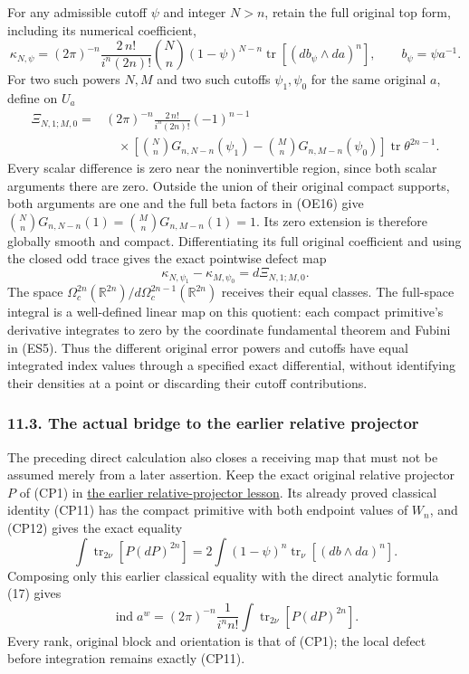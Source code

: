 \documentclass[
  11pt,
]{article}
\begin{document}
For any admissible cutoff \(\psi\) and integer \(N>n\), retain the full
original top form, including its numerical coefficient, \[
\kappa_{N,\psi}
 =(2\pi)^{-n}\frac{2\,n!}{i^n(2n)!}
       \binom Nn(1-\psi)^{N-n}
                         \operatorname{tr}[(db_\psi\wedge da)^n],
\qquad b_\psi=\psi a^{-1}.
\tag{OE18}
\] For two such powers \(N,M\) and two such cutoffs \(\psi_1,\psi_0\)
for the same original \(a\), define on \(U_a\) \[
\begin{split}
\Xi_{N,1;M,0}
  ={}&(2\pi)^{-n}\frac{2\,n!}{i^n(2n)!}(-1)^{n-1}\\
    &\quad\times
      \left[\binom NnG_{n,N-n}(\psi_1)
            -\binom MnG_{n,M-n}(\psi_0)\right]
                         \operatorname{tr}\theta^{2n-1}.
\end{split}
\tag{OE19}
\] Every scalar difference is zero near the noninvertible region, since
both scalar arguments there are zero. Outside the union of their
original compact supports, both arguments are one and the full beta
factors in (OE16) give
\(\binom NnG_{n,N-n}(1)=\binom MnG_{n,M-n}(1)=1\). Its zero extension is
therefore globally smooth and compact. Differentiating its full original
coefficient and using the closed odd trace gives the exact pointwise
defect map \[
\kappa_{N,\psi_1}-\kappa_{M,\psi_0}
                         =d\Xi_{N,1;M,0}.
\tag{OE20}
\] The space \(\Omega_c^{2n}(\mathbb R^{2n})/
                         d\Omega_c^{2n-1}(\mathbb R^{2n})\) receives
their equal classes. The full-space integral is a well-defined linear
map on this quotient: each compact primitive's derivative integrates to
zero by the coordinate fundamental theorem and Fubini in (ES5). Thus the
different original error powers and cutoffs have equal integrated index
values through a specified exact differential, without identifying their
densities at a point or discarding their cutoff contributions.

\subsubsection{11.3. The actual bridge to the earlier relative
projector}\label{the-actual-bridge-to-the-earlier-relative-projector}

The preceding direct calculation also closes a receiving map that must
not be assumed merely from a later assertion. Keep the exact original
relative projector \(P\) of (CP1) in
\href{relative-projectors-chern-cutoff.pdf}{the earlier
relative-projector lesson}. Its already proved classical identity (CP11)
has the compact primitive with both endpoint values of \(W_n\), and
(CP12) gives the exact equality \[
\int\operatorname{tr}_{2\nu}[P(dP)^{2n}]
      =2\int(1-\psi)^n
                         \operatorname{tr}_{\nu}[(db\wedge da)^n].
\tag{OE21}
\] Composing only this earlier classical equality with the direct
analytic formula (17) gives \[
\operatorname{ind}a^w
 =(2\pi)^{-n}\frac1{i^n n!}
        \int\operatorname{tr}_{2\nu}[P(dP)^{2n}].
\tag{OE22}
\] Every rank, original block and orientation is that of (CP1); the
local defect before integration remains exactly (CP11).
\end{document}
